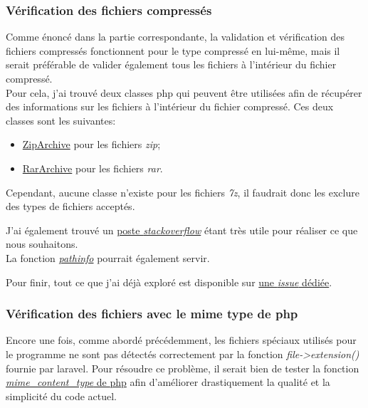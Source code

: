\documentclass[
    iai, %
    il, %
]{heig-tb}
\begin{document}
\subsubsection{Vérification des fichiers compressés}
Comme énoncé dans la partie correspondante, la validation et vérification des fichiers compressés fonctionnent pour le type compressé en lui-même, mais il serait préférable de valider également tous les fichiers à l'intérieur du fichier compressé. \\
Pour cela, j'ai trouvé deux classes \Gls{php} qui peuvent être utilisées afin de récupérer des informations sur les fichiers à l'intérieur du fichier compressé. Ces deux classes sont les suivantes:
\begin{itemize}
    \item \href{https://www.php.net/manual/fr/class.ziparchive.php}{ZipArchive} pour les fichiers \emph{zip};
    \item \href{https://www.php.net/manual/en/class.rararchive.php}{RarArchive} pour les fichiers \emph{rar}.
\end{itemize}

Cependant, aucune classe n'existe pour les fichiers \emph{7z}, il faudrait donc les exclure des types de fichiers acceptés.

J'ai également trouvé un \href{https://stackoverflow.com/questions/25847374/ziparchive-check-file-extension}{poste \emph{stackoverflow}} étant très utile pour réaliser ce que nous souhaitons. \\
La fonction \href{https://www.php.net/manual/fr/function.pathinfo.php}{\emph{pathinfo}} pourrait également servir.

Pour finir, tout ce que j'ai déjà exploré est disponible sur \href{https://github.com/heig-fablab/fablab-manager/issues/139}{une \emph{issue} dédiée}.

\subsubsection{Vérification des fichiers avec le mime type de php}
Encore une fois, comme abordé précédemment, les fichiers spéciaux utilisés pour le programme ne sont pas détectés correctement par la fonction \emph{file->extension()} fournie par \Gls{laravel}.
Pour résoudre ce problème, il serait bien de tester la fonction \href{https://www.php.net/manual/fr/function.mime-content-type.php}{\emph{mime\_content\_type} de \Gls{php}} afin d'améliorer drastiquement la qualité et la simplicité du code actuel.
\end{document}
